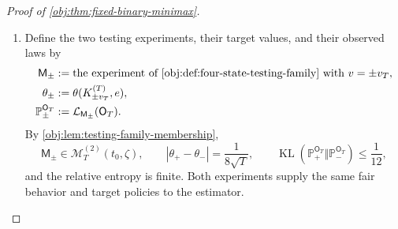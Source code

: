 \documentclass[11pt]{article}
\begin{document}
\begin{proof}[Proof of \cref{obj:thm:fixed-binary-minimax}]
\begin{enumerate}
\item Define the two testing experiments, their target values, and their observed laws by
\[
\begin{aligned}
\mathsf M_\pm
&:=\text{the experiment of \cref{obj:def:four-state-testing-family}
with }v=\pm v_T,\\
\theta_\pm&:=\theta(K_{\pm v_T}^{(T)},e),\\
\mathbb P_\pm^{\mathsf O_T}
&:=\mathcal L_{\mathsf M_\pm}(\mathsf O_T).
\end{aligned}
\]
By \cref{obj:lem:testing-family-membership},
\[
\mathsf M_\pm\in\mathcal M_T^{(2)}(t_0,\zeta),
\qquad
|\theta_+-\theta_-|=\frac1{8\sqrt T},
\qquad
\operatorname{KL}\!\left(
\mathbb P_+^{\mathsf O_T}\Vert\mathbb P_-^{\mathsf O_T}
\right)\leq\frac1{12},
\]
and the relative entropy is finite. Both experiments supply the same fair behavior and target policies to the estimator.


\end{enumerate}
\end{proof}
\end{document}
